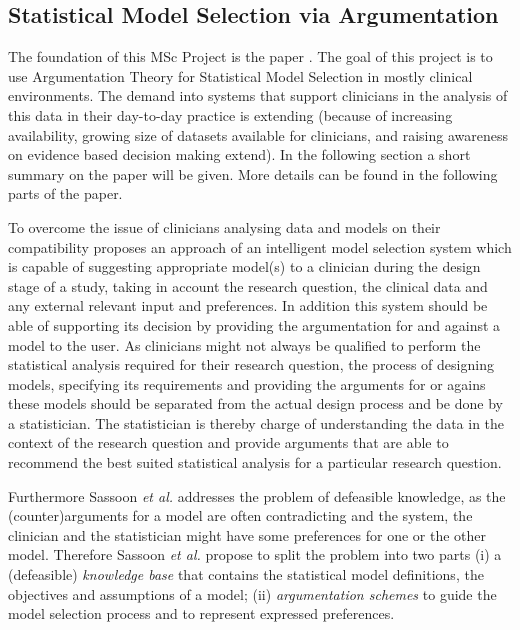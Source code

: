 \subsection{Statistical Model Selection via Argumentation}
The foundation of this MSc Project is the paper \cite{sassoon2014}. 
The goal of this project is to use Argumentation Theory for Statistical Model Selection in mostly clinical environments. The demand into systems that support clinicians in the analysis of this data in their day-to-day practice is extending (because of increasing availability, growing size of datasets available for clinicians, and raising awareness on evidence based decision making extend). In the following section a short summary on the paper will be given. More details can be found in the following parts of the paper.

To overcome the issue of clinicians analysing data and models on their compatibility \cite{sassoon2014} proposes an approach of an intelligent model selection system which is capable of suggesting appropriate model(s) to a clinician during the design stage of a study, taking in account the research question, the clinical data and any external relevant input and preferences. In addition this system should be able of supporting its decision by providing the argumentation for and against a model to the user. As clinicians might not always be qualified to perform the statistical analysis required for their research question, the process of designing models, specifying its requirements and providing the arguments for or agains these models should be separated from the actual design process and be done by a statistician. The statistician is thereby  charge of understanding the data in the context of the research question and provide arguments that are able to recommend the best suited statistical analysis for a particular research question. 

Furthermore  Sassoon \textit{et al.} \cite{sassoon2014} addresses the problem of defeasible knowledge, as the (counter)arguments for a model are often contradicting and the system, the clinician and the statistician might have some preferences for one or the other model. Therefore Sassoon \textit{et al.} propose to split the problem into two parts (i) a (defeasible) \textit{knowledge base} that contains the statistical model definitions, the objectives and assumptions of a model; (ii) \textit{argumentation schemes} to guide the model selection process and to represent expressed preferences.

